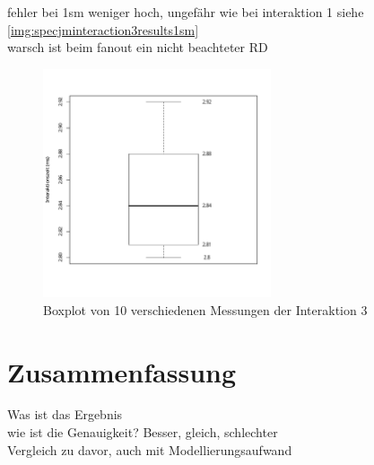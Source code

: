 fehler bei 1sm weniger hoch, ungefähr wie bei interaktion 1 siehe \autoref{img:specjminteraction3results1sm} \\
warsch ist beim fanout ein nicht beachteter RD

\begin{figure}
\center
  \includegraphics[width=0.6\textwidth]{images/evaluation/specjmsresults/interaktion3-1SM.pdf}
  \caption{Boxplot von 10 verschiedenen Messungen der Interaktion 3}
  \label{img:specjminteraction3results1sm}
\end{figure}


\section{Zusammenfassung}
Was ist das Ergebnis \\
wie ist die Genauigkeit? Besser, gleich, schlechter\\
Vergleich zu davor, auch mit Modellierungsaufwand \\



